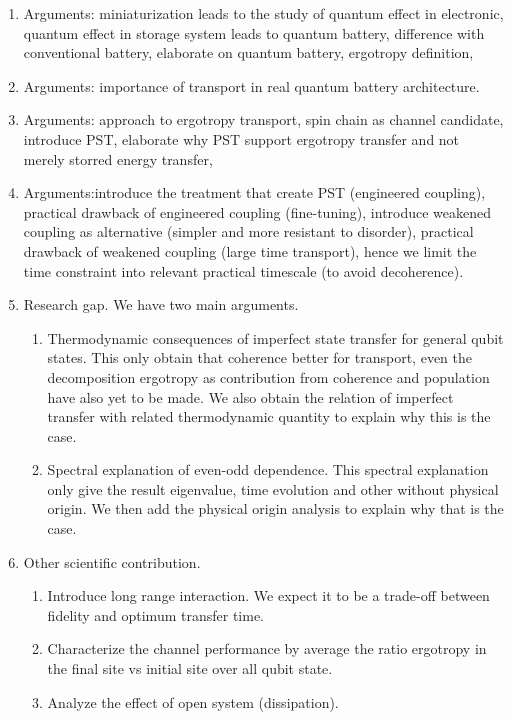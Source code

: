 \documentclass[../../../main.tex]{subfiles}
\begin{document}
\begin{enumerate}
  \item
        Arguments: miniaturization leads to the study of quantum effect in electronic, quantum effect in storage system leads to quantum battery, difference with conventional battery, elaborate on quantum battery, ergotropy definition, 
  \item
        Arguments: importance of transport in real quantum battery architecture.

  \item
        Arguments: approach to ergotropy transport, spin chain as channel candidate, introduce PST, elaborate why PST support ergotropy transfer and not merely storred energy transfer, 
  \item
        Arguments:introduce the treatment that create PST (engineered coupling), practical drawback of engineered coupling (fine-tuning), introduce weakened coupling as alternative (simpler and more resistant to disorder), practical drawback of weakened coupling (large time transport), hence we limit the time constraint into relevant practical timescale (to avoid decoherence).

  \item Research gap. We have two main arguments.
        \begin{enumerate}
          \item Thermodynamic consequences of imperfect state transfer for general qubit states.
                This only obtain that coherence better for transport, even the decomposition ergotropy as contribution from coherence and population have also yet to be made. We also obtain the relation of imperfect transfer with related thermodynamic quantity to explain why this is the case.

          \item Spectral explanation of even-odd dependence.
                This spectral explanation only give the result eigenvalue, time evolution and other without physical origin. We then add the physical origin analysis to explain why that is the case.
        \end{enumerate}

  \item
        Other scientific contribution.
        \begin{enumerate}
          \item Introduce long range interaction. We expect it to be a trade-off between fidelity and optimum transfer time.
          \item Characterize the channel performance by average the ratio ergotropy in the final site vs initial site over all qubit state.
          \item Analyze the effect of open system (dissipation).
        \end{enumerate}
\end{enumerate}
\end{document}
